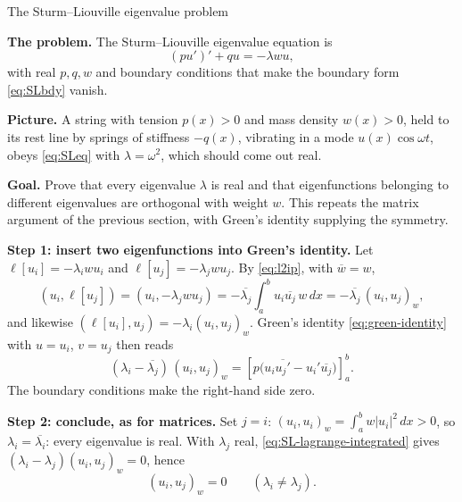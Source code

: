 \documentclass[11pt]{beamer}
\begin{document}
\begin{frame}[allowframebreaks=1.00]{The Sturm--Liouville eigenvalue problem}
\footnotesize

\textbf{The problem.} The Sturm--Liouville eigenvalue equation is
\begin{equation}
  (pu')'+qu=-\lambda wu,
  \label{eq:SLeq}
\end{equation}
with real $p,q,w$ and boundary conditions that make the boundary form \eqref{eq:SLbdy} vanish.

\textbf{Picture.} A string with tension $p(x)>0$ and mass density $w(x)>0$, held to its
rest line by springs of stiffness $-q(x)$, vibrating in a mode $u(x)\cos\omega t$,
obeys \eqref{eq:SLeq} with $\lambda=\omega^2$, which should come out real.

\textbf{Goal.} Prove that every eigenvalue $\lambda$ is real and that eigenfunctions belonging to
different eigenvalues are orthogonal with weight $w$. This repeats the matrix argument of the
previous section, with Green's identity supplying the symmetry.

\par\framebreak\par
\textbf{Step 1: insert two eigenfunctions into Green's identity.}  Let
$\ell[u_i]=-\lambda_iwu_i$ and $\ell[u_j]=-\lambda_jwu_j$.
By \eqref{eq:l2ip}, with $\overline w=w$,
\[
  (u_i,\ell[u_j])=(u_i,-\lambda_jwu_j)=-\overline{\lambda_j}\int_a^b u_i\overline{u_j}\,w\,dx=-\overline{\lambda_j}\,(u_i,u_j)_w,
\]
and likewise $(\ell[u_i],u_j)=-\lambda_i(u_i,u_j)_w$.
Green's identity \eqref{eq:green-identity} with $u=u_i$, $v=u_j$ then reads
\begin{equation}
  (\lambda_i-\overline{\lambda_j})\,(u_i,u_j)_w
  =\left[p\bigl(u_i\overline{u_j'}-u_i'\overline{u_j}\bigr)\right]_a^b .
  \label{eq:SL-lagrange-integrated}
\end{equation}
The boundary conditions make the right-hand side zero.

\textbf{Step 2: conclude, as for matrices.}  Set $j=i$: $(u_i,u_i)_w=\int_a^b w|u_i|^2\,dx>0$,
so $\lambda_i=\overline{\lambda_i}$: every eigenvalue is real.  With $\lambda_j$ real,
\eqref{eq:SL-lagrange-integrated} gives $(\lambda_i-\lambda_j)(u_i,u_j)_w=0$, hence
\begin{equation}
  (u_i,u_j)_w=0
  \qquad(\lambda_i\neq\lambda_j).
  \label{eq:SL-weighted-orthogonality}
\end{equation}
\end{frame}
\end{document}
